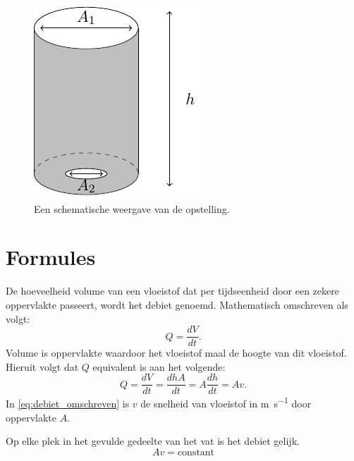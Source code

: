 \documentclass[numbers=endperiod]{scrartcl}
\begin{document}
\begin{figure}[ht]
\centering
\caption{Een schematische weergave van de opstelling.}
\includegraphics[scale=0.8]{Beker.pdf}    
\end{figure}

\newpage
\section{Formules}
De hoeveelheid volume van een vloeistof dat per tijdseenheid door een zekere oppervlakte passeert, wordt het debiet genoemd. Mathematisch omschreven als volgt:
\begin{equation}\label{eq:debiet}
    Q = \frac{dV}{dt}.
\end{equation}
Volume is oppervlakte waardoor het vloeistof maal de hoogte van dit vloeistof. Hieruit volgt dat $Q$ equivalent is aan het volgende:
\begin{equation}\label{eq:debiet_omschreven}
    Q = \frac{dV}{dt} = \frac{dhA}{dt} = A\frac{dh}{dt} = Av.
\end{equation}
In \cref{eq:debiet_omschreven} is $v$ de snelheid van vloeistof in \si{\meter\per\second} door oppervlakte $A$.

Op elke plek in het gevulde gedeelte van het vat is het debiet gelijk. 
\begin{equation}\label{eq:constant_debiet}
    Av = \text{constant}
\end{equation}
\end{document}
